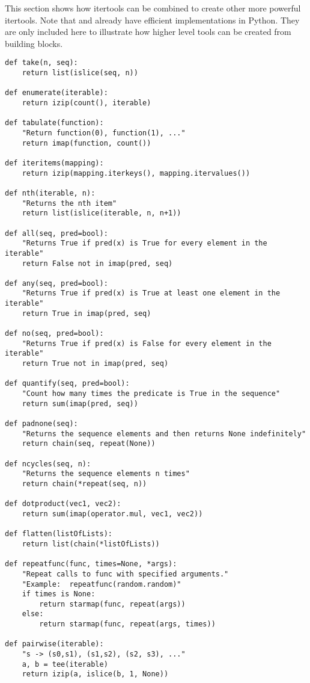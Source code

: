 This section shows how itertools can be combined to create other more
powerful itertools.  Note that  and 
already have efficient implementations in Python.  They are only included here
to illustrate how higher level tools can be created from building blocks.

\begin{verbatim}
def take(n, seq):
    return list(islice(seq, n))

def enumerate(iterable):
    return izip(count(), iterable)

def tabulate(function):
    "Return function(0), function(1), ..."
    return imap(function, count())

def iteritems(mapping):
    return izip(mapping.iterkeys(), mapping.itervalues())

def nth(iterable, n):
    "Returns the nth item"
    return list(islice(iterable, n, n+1))

def all(seq, pred=bool):
    "Returns True if pred(x) is True for every element in the iterable"
    return False not in imap(pred, seq)

def any(seq, pred=bool):
    "Returns True if pred(x) is True at least one element in the iterable"
    return True in imap(pred, seq)

def no(seq, pred=bool):
    "Returns True if pred(x) is False for every element in the iterable"
    return True not in imap(pred, seq)

def quantify(seq, pred=bool):
    "Count how many times the predicate is True in the sequence"
    return sum(imap(pred, seq))

def padnone(seq):
    "Returns the sequence elements and then returns None indefinitely"
    return chain(seq, repeat(None))

def ncycles(seq, n):
    "Returns the sequence elements n times"
    return chain(*repeat(seq, n))

def dotproduct(vec1, vec2):
    return sum(imap(operator.mul, vec1, vec2))

def flatten(listOfLists):
    return list(chain(*listOfLists))

def repeatfunc(func, times=None, *args):
    "Repeat calls to func with specified arguments."
    "Example:  repeatfunc(random.random)"
    if times is None:
        return starmap(func, repeat(args))
    else:
        return starmap(func, repeat(args, times))

def pairwise(iterable):
    "s -> (s0,s1), (s1,s2), (s2, s3), ..."
    a, b = tee(iterable)
    return izip(a, islice(b, 1, None))

\end{verbatim}
